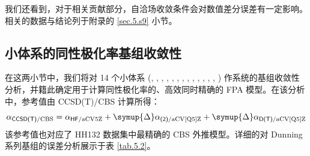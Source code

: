 我们还看到，对于相关贡献部分，自洽场收敛条件会对数值差分误差有一定影响。相关的数据与结论列于附录的 \ref{sec.5.s9} 小节。

\subsection{小体系的同性极化率基组收敛性}

在这两小节中，我们将对 14 个小体系 (, , , , , , , , , , , , , ) 作系统的基组收敛性分析，并籍此确定用于计算同性极化率的、高效同时精确的 FPA 模型。在该分析中，参考值由 CCSD(T)/CBS 计算所得：
\begin{equation}
    \alpha_{\textsf{CCSD(T)}/\text{CBS}} = \alpha_{\textsf{HF}/\text{aCV5Z}} + \symup{\Delta} \alpha_{\textsf{(2)}/\text{aCV[Q5]Z}} + \symup{\Delta} \alpha_{\textsf{D(T)}/\text{aCV[Q5]Z}}
\end{equation}
该参考值也对应了 HH132 数据集中最精确的 CBS 外推模型。详细的对 Dunning 系列基组的误差分析展示于表 \ref{tab.5.2}。


